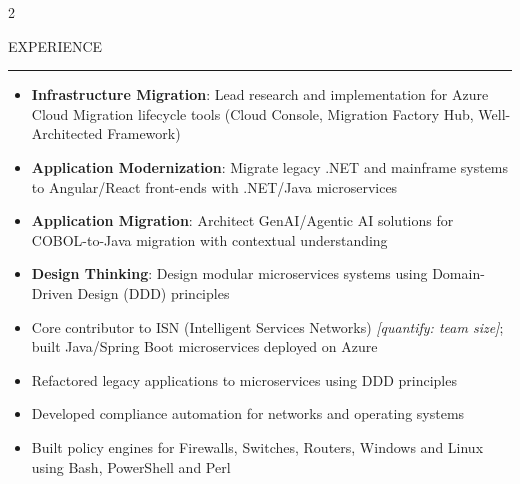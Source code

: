 \documentclass[10pt,a4paper,ragged2e,withhyper]{altacv}
\renewcommand{\cvsection}[2][]{%
  \nointerlineskip\medskip%
  \ifstrequal{#1}{}{}{\marginpar{\vspace*{\dimexpr1pt-\baselineskip}\raggedright}}%
  {\color{heading}\cvsectionfont\MakeUppercase{#2}}\\[-1ex]%
  {\color{headingrule}\rule{\linewidth}{2pt}\par}\smallskip
}
\begin{document}
\makecvheader%

\begin{paracol}{2}

\cvsection{Experience}
\begin{itemize}
\item \textbf{Infrastructure Migration}: Lead research and implementation for Azure Cloud Migration lifecycle tools (Cloud Console, Migration Factory Hub, Well-Architected Framework)
\item \textbf{Application Modernization}: Migrate legacy .NET and mainframe systems to Angular/React front-ends with .NET/Java microservices
\item \textbf{Application Migration}: Architect GenAI/Agentic AI solutions for COBOL-to-Java migration with contextual understanding
\item \textbf{Design Thinking}: Design modular microservices systems using Domain-Driven Design (DDD) principles
\end{itemize}
\divider%

\begin{itemize}
\item Core contributor to ISN (Intelligent Services Networks) \textit{[quantify: team size]}; built Java/Spring Boot microservices deployed on Azure
\item Refactored legacy applications to microservices using DDD principles
\end{itemize}
\divider%

\begin{itemize}
\item Developed compliance automation for networks and operating systems
\item Built policy engines for Firewalls, Switches, Routers, Windows and Linux using Bash, PowerShell and Perl
\end{itemize}
\divider%


\end{paracol}
\end{document}
